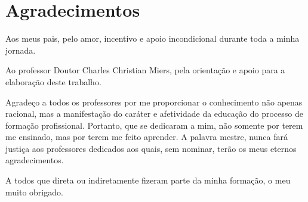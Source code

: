 \section*{Agradecimentos}


Aos meus pais, pelo amor, incentivo e apoio incondicional durante toda a minha jornada.



Ao professor Doutor Charles Christian Miers, pela orientação e apoio para a elaboração deste trabalho.



Agradeço a todos os professores por me proporcionar o conhecimento não apenas racional, mas a manifestação do caráter e afetividade da educação do processo de formação profissional.
%
Portanto, que se dedicaram a mim, não somente por terem me ensinado, mas por terem me feito aprender. 
%
A palavra mestre, nunca fará justiça aos professores dedicados aos quais, sem nominar, terão os meus eternos agradecimentos.



A todos que direta ou indiretamente fizeram parte da minha formação, o meu muito obrigado.